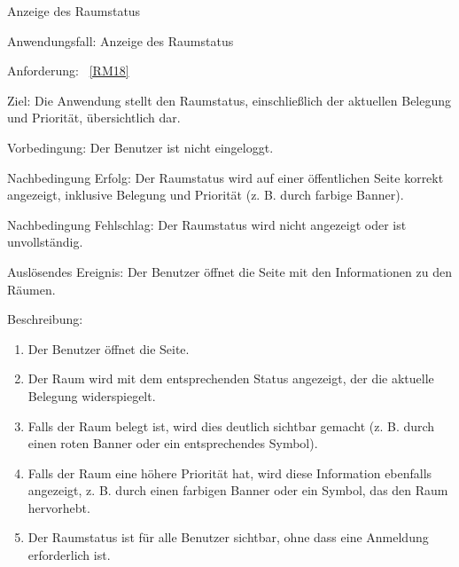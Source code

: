 \begin{function}{60}{Anzeige des Raumstatus}
    \item[Anwendungsfall:] Anzeige des Raumstatus
    \item[Anforderung:] ~\ref{RM18}
    \item[Ziel:] Die Anwendung stellt den Raumstatus, einschließlich der aktuellen Belegung und Priorität, übersichtlich dar.
    \item[Vorbedingung:] Der Benutzer ist nicht eingeloggt.
    \item[Nachbedingung Erfolg:] Der Raumstatus wird auf einer öffentlichen Seite korrekt angezeigt, inklusive Belegung und Priorität (z. B. durch farbige Banner).
    \item[Nachbedingung Fehlschlag:] Der Raumstatus wird nicht angezeigt oder ist unvollständig.
    \item[Auslösendes Ereignis:] Der Benutzer öffnet die Seite mit den Informationen zu den Räumen.
    \item[Beschreibung:] ~
    \begin{enumerate}
        \item Der Benutzer öffnet die Seite.
        \item Der Raum wird mit dem entsprechenden Status angezeigt, der die aktuelle Belegung widerspiegelt.
        \item Falls der Raum belegt ist, wird dies deutlich sichtbar gemacht (z. B. durch einen roten Banner oder ein entsprechendes Symbol).
        \item Falls der Raum eine höhere Priorität hat, wird diese Information ebenfalls angezeigt, z. B. durch einen farbigen Banner oder ein Symbol, das den Raum hervorhebt.
        \item Der Raumstatus ist für alle Benutzer sichtbar, ohne dass eine Anmeldung erforderlich ist.
    \end{enumerate}
\end{function}

